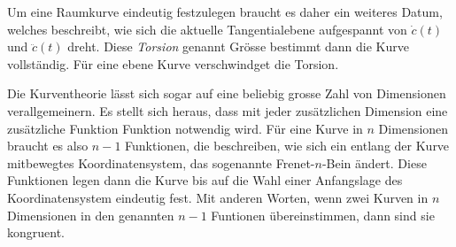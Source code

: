 Um eine Raumkurve eindeutig festzulegen braucht es daher ein weiteres
Datum, welches beschreibt, wie sich die aktuelle Tangentialebene
aufgespannt von $\dot c(t)$ und $\ddot c(t)$ dreht.
Diese {\em Torsion} genannt Grösse bestimmt dann die Kurve vollständig.
Für eine ebene Kurve verschwindget die Torsion.

Die Kurventheorie lässt sich sogar auf eine beliebig grosse Zahl
von Dimensionen verallgemeinern.
Es stellt sich heraus, dass mit jeder zusätzlichen Dimension eine
zusätzliche Funktion Funktion notwendig wird.
Für eine Kurve in $n$ Dimensionen braucht es also $n-1$ Funktionen,
die beschreiben, wie sich ein entlang der Kurve mitbewegtes Koordinatensystem,
das sogenannte Frenet-$n$-Bein ändert.
Diese Funktionen legen dann die Kurve bis auf die Wahl einer Anfangslage
des Koordinatensystem eindeutig fest.
Mit anderen Worten, wenn zwei Kurven in $n$ Dimensionen in den genannten
$n-1$ Funtionen übereinstimmen, dann sind sie kongruent.


